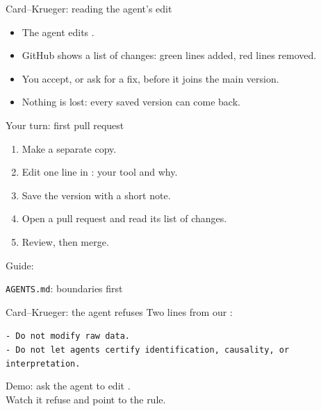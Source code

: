 \begin{frame}{Card--Krueger: reading the agent's edit}
  \begin{itemize}
    \item The agent edits .
    \item GitHub shows a list of changes: green lines added, red lines removed.
    \item You accept, or ask for a fix, before it joins the main version.
    \item Nothing is lost: every saved version can come back.
  \end{itemize}
\end{frame}

\begin{frame}{Your turn: first pull request}
  \vspace{0.3em}
  \begin{enumerate}
    \item Make a separate copy.
    \item Edit one line in : your tool and why.
    \item Save the version with a short note.
    \item Open a pull request and read its list of changes.
    \item Review, then merge.
  \end{enumerate}
  {\small Guide:  \textperiodcentered\ }
\end{frame}

\begin{frame}{\texttt{AGENTS.md}: boundaries first}
\end{frame}

\begin{frame}{Card--Krueger: the agent refuses}
  Two lines from our :
  \vspace{0.3em}
  \begin{block}{}
    \texttt{- Do not modify raw data.}\\
    \texttt{- Do not let agents certify identification, causality, or interpretation.}
  \end{block}
  \vspace{0.4em}
  Demo: ask the agent to edit .\\
  Watch it refuse and point to the rule.
\end{frame}

